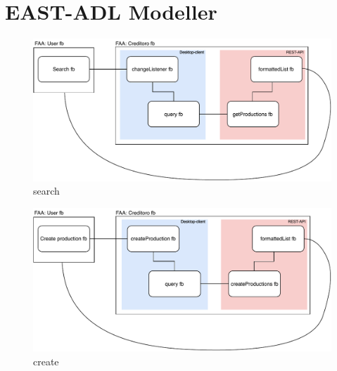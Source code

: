 \section{EAST-ADL Modeller} \label{east_adl_models}

\begin{figure}[h]
\centering
\includegraphics[scale=1]{figures/EAST-ADL/search.pdf}
\caption{search}
\label{fig:search}
\end{figure}

\begin{figure}[h]
\centering
\includegraphics[scale=1]{figures/EAST-ADL/create.pdf}
\caption{create}
\label{fig:create}
\end{figure}

